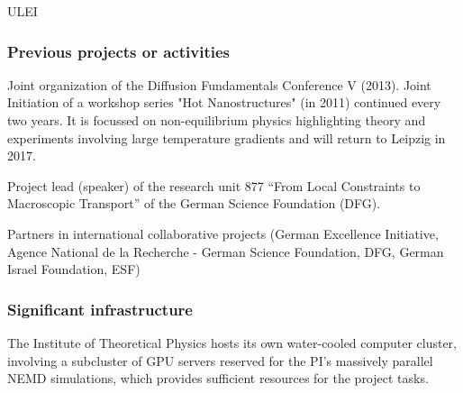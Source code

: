 \begin{sitedescription}{ULEI}
\begin{compactenum}




\end{compactenum}

\subsubsection*{Previous projects or activities}

\begin{compactenum}
%
\item Joint organization of the Diffusion Fundamentals Conference V (2013). 
Joint Initiation of a workshop series "Hot Nanostructures"
(in 2011) continued every two years. It is focussed on non-equilibrium physics highlighting theory and experiments 
involving large temperature gradients and will return to Leipzig in 2017. 

\item Project lead (speaker) of the research unit 877 ``From Local Constraints to Macroscopic Transport'' of the German 
Science Foundation (DFG).

\item Partners in international collaborative projects (German Excellence Initiative, Agence National de la Recherche - 
German Science Foundation, DFG, German Israel Foundation, ESF)
\end{compactenum}

\subsubsection*{Significant infrastructure}
The Institute of Theoretical Physics hosts its own water-cooled computer cluster, 
involving a subcluster of GPU servers reserved for the PI's massively parallel NEMD simulations, 
which provides sufficient resources for the project tasks.
\end{sitedescription}

